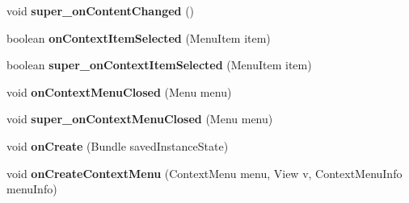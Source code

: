 \begin{DoxyCompactItemize}
\item 
\mbox{\label{classorg_1_1qtproject_1_1qt5_1_1android_1_1bindings_1_1_qt_activity_a65dc57b70d42eb56f6bc12f7e0c49022}} 
void {\bfseries super\+\_\+on\+Content\+Changed} ()
\item 
\mbox{\label{classorg_1_1qtproject_1_1qt5_1_1android_1_1bindings_1_1_qt_activity_a67108692da62e48e5d02b22ed3d83769}} 
boolean {\bfseries on\+Context\+Item\+Selected} (Menu\+Item item)
\item 
\mbox{\label{classorg_1_1qtproject_1_1qt5_1_1android_1_1bindings_1_1_qt_activity_a7281a498436213e739110753b357c0bd}} 
boolean {\bfseries super\+\_\+on\+Context\+Item\+Selected} (Menu\+Item item)
\item 
\mbox{\label{classorg_1_1qtproject_1_1qt5_1_1android_1_1bindings_1_1_qt_activity_a3e845800dc8fc21ff23589005d1a781c}} 
void {\bfseries on\+Context\+Menu\+Closed} (Menu menu)
\item 
\mbox{\label{classorg_1_1qtproject_1_1qt5_1_1android_1_1bindings_1_1_qt_activity_a1b845060cb1ae8dde9bb8a60339b9468}} 
void {\bfseries super\+\_\+on\+Context\+Menu\+Closed} (Menu menu)
\item 
\mbox{\label{classorg_1_1qtproject_1_1qt5_1_1android_1_1bindings_1_1_qt_activity_aa826639406d6f0697e0f1afcf69c748c}} 
void {\bfseries on\+Create} (Bundle saved\+Instance\+State)
\item 
\mbox{\label{classorg_1_1qtproject_1_1qt5_1_1android_1_1bindings_1_1_qt_activity_a924489f96650a755cf63980f3d388e8e}} 
void {\bfseries on\+Create\+Context\+Menu} (Context\+Menu menu, View v, Context\+Menu\+Info menu\+Info)
\item 
\mbox{\label{classorg_1_1qtproject_1_1qt5_1_1android_1_1bindings_1_1_qt_activity_ae235bff28fac3ae862e49a1fc52caf15}} 

\end{DoxyCompactItemize}
